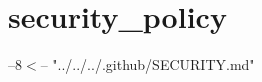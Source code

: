\chapter{security\+\_\+policy }
\hypertarget{md_include_2nlohman_2json-develop_2docs_2mkdocs_2docs_2community_2security__policy}{}\label{md_include_2nlohman_2json-develop_2docs_2mkdocs_2docs_2community_2security__policy}
--8\texorpdfstring{$<$}{<}-- "{}../\+../\+../\+.\+github/\+\+SECURITY.\+md"{} 